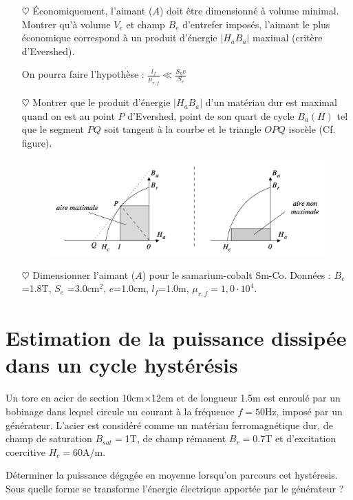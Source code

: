 \documentclass{report}
\begin{document}
\begin{itemize}

	\item[$\heartsuit$] Économiquement, l’aimant ($A$) doit être dimensionné à volume minimal. Montrer qu’à volume $V_e$ et champ $B_e$ d’entrefer imposés, l’aimant le plus économique correspond à un produit d’énergie $|H_aB_a|$ maximal (critère d’Evershed). 
	
	On pourra faire l'hypothèse : $\frac{l_f}{\mu_{r,f}}\ll\frac{S_ae}{S_e}$

	\item[$\heartsuit$] Montrer que le produit d’énergie $|H_aB_a|$ d’un matériau dur est maximal quand on est au point $P$ d’Evershed, point de son quart de cycle $B_a(H)$ tel que le segment $PQ$ soit tangent à la courbe et le triangle $OPQ$ isocèle (Cf. figure).
	
	\begin{figure}[h!]
	\centering
		\includegraphics[scale=0.35]{produit_energie.png}
	\end{figure}	
	
	\item[$\heartsuit$] Dimensionner l'aimant ($A$) pour le samarium-cobalt Sm-Co. Données : $B_e$ =1.8T, $S_e$ =3.0cm$^2$, $e$=1.0cm, $l_f$=1.0m, $\mu_{r,f}=1,0\cdot10^4$.

\end{itemize}

\section*{Estimation de la puissance  dissipée dans un cycle hystérésis}

Un tore en acier de section 10cm$\times$12cm et de longueur 1.5m est enroulé par un bobinage dans lequel circule un courant à la fréquence $f=50$Hz, imposé par un générateur. L'acier est considéré comme un matériau ferromagnétique dur, de champ de saturation $B_{sat}=$1T, de champ rémanent $B_r=$0.7T et d'excitation coercitive $H_c=60$A/m.

Déterminer la puissance dégagée en moyenne lorsqu'on parcours cet hystéresis. Sous quelle forme se transforme l'énergie électrique apportée par le générateur ?
\end{document}
